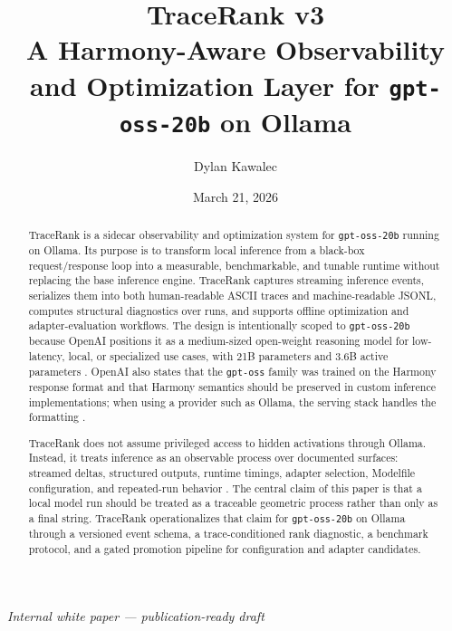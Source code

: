     \newtheorem{definition}{Definition}
    \newtheorem{proposition}{Proposition}
    \newtheorem{remark}{Remark}
    
    \title{\textbf{TraceRank v3}\\[0.4em]
    \large A Harmony-Aware Observability and Optimization Layer for \texttt{gpt-oss-20b} on Ollama}
    \author{Dylan Kawalec}
    \date{March 21, 2026}
    
    
    \maketitle
    \begin{center}
    \textit{Internal white paper --- publication-ready draft}
    \end{center}
    
    \begin{abstract}
    TraceRank is a sidecar observability and optimization system for \texttt{gpt-oss-20b} running on Ollama. Its purpose is to transform local inference from a black-box request/response loop into a measurable, benchmarkable, and tunable runtime without replacing the base inference engine. TraceRank captures streaming inference events, serializes them into both human-readable ASCII traces and machine-readable JSONL, computes structural diagnostics over runs, and supports offline optimization and adapter-evaluation workflows. The design is intentionally scoped to \texttt{gpt-oss-20b} because OpenAI positions it as a medium-sized open-weight reasoning model for low-latency, local, or specialized use cases, with 21B parameters and 3.6B active parameters \cite{openai_gptoss20b}. OpenAI also states that the \texttt{gpt-oss} family was trained on the Harmony response format and that Harmony semantics should be preserved in custom inference implementations; when using a provider such as Ollama, the serving stack handles the formatting \cite{openai_harmony,openai_ollama_guide}.
    
    TraceRank does not assume privileged access to hidden activations through Ollama. Instead, it treats inference as an observable process over documented surfaces: streamed deltas, structured outputs, runtime timings, adapter selection, Modelfile configuration, and repeated-run behavior \cite{ollama_structured,ollama_modelfile,ollama_faq}. The central claim of this paper is that a local model run should be treated as a traceable geometric process rather than only as a final string. TraceRank operationalizes that claim for \texttt{gpt-oss-20b} on Ollama through a versioned event schema, a trace-conditioned rank diagnostic, a benchmark protocol, and a gated promotion pipeline for configuration and adapter candidates.
    \end{abstract}
    
